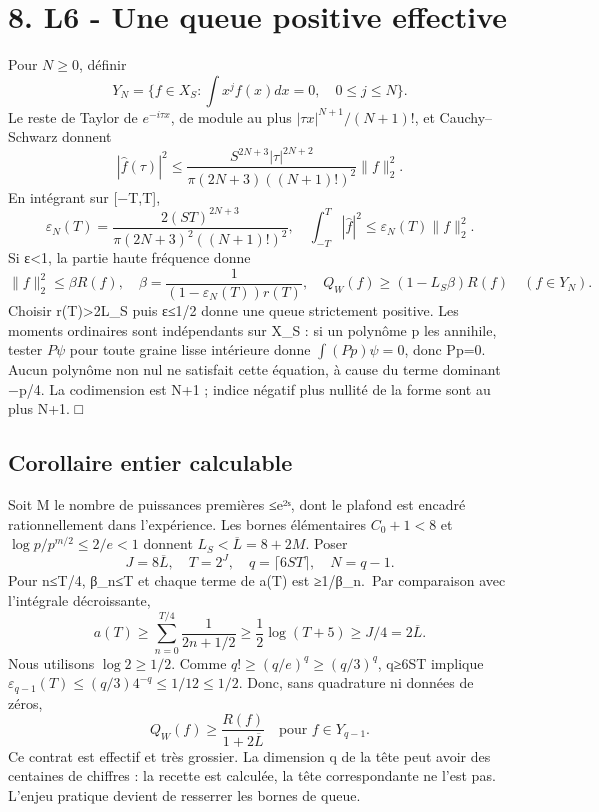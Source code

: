 \documentclass[
  10pt,
  a4paper,
]{article}
\begin{document}
\hypertarget{l6---une-queue-positive-effective}{%
\section{8. L6 - Une queue positive
effective}\label{l6---une-queue-positive-effective}}

Pour \(N\ge0\), définir \[
Y_N=\{f\in X_S:\int x^j f(x)dx=0,\quad0\le j\le N\}.
\] Le reste de Taylor de \(e^{-i\tau x}\), de module au plus
\(|\tau x|^{N+1}/(N+1)!\), et Cauchy--Schwarz donnent \[
|\widehat f(\tau)|^2\le
\frac{S^{2N+3}|\tau|^{2N+2}}{\pi(2N+3)((N+1)!)^2}\|f\|_2^2.
\] En intégrant sur {[}−T,T{]}, \[
\varepsilon_N(T)=\frac{2(ST)^{2N+3}}{\pi(2N+3)^2((N+1)!)^2},\quad
\int_{-T}^{T}|\widehat f|^2\le\varepsilon_N(T)\|f\|_2^2.
\] Si ε\textless1, la partie haute fréquence donne \[
\|f\|_2^2\le\beta R(f),\quad
\beta=\frac1{(1-\varepsilon_N(T))r(T)},\quad
Q_W(f)\ge(1-L_S\beta)R(f)\quad(f\in Y_N).
\] Choisir r(T)\textgreater2L\_S puis ε≤1/2 donne une queue strictement
positive. Les moments ordinaires sont indépendants sur X\_S : si un
polynôme p les annihile, tester \(P\psi\) pour toute graine lisse
intérieure donne \(\int(Pp)\psi=0\), donc Pp=0. Aucun polynôme non nul
ne satisfait cette équation, à cause du terme dominant −p/4. La
codimension est N+1 ; indice négatif plus nullité de la forme sont au
plus N+1. □

\hypertarget{corollaire-entier-calculable}{%
\subsection{Corollaire entier
calculable}\label{corollaire-entier-calculable}}

Soit M le nombre de puissances premières ≤e²ˢ, dont le plafond est
encadré rationnellement dans l'expérience. Les bornes élémentaires
\(C_0+1<8\) et \(\log p/p^{m/2}\le2/e<1\) donnent
\(L_S<\overline L=8+2M\). Poser \[
J=8\overline L,\quad T=2^J,\quad q=\lceil6ST\rceil,\quad N=q-1.
\] Pour n≤T/4, β\_n≤T et chaque terme de a(T) est ≥1/β\_n.~Par
comparaison avec l'intégrale décroissante, \[
a(T)\ge\sum_{n=0}^{T/4}\frac1{2n+1/2}
\ge\frac12\log(T+5)\ge J/4=2\overline L.
\] Nous utilisons \(\log2\ge1/2\). Comme \(q!\ge(q/e)^q\ge(q/3)^q\),
q≥6ST implique \(\varepsilon_{q-1}(T)\le(q/3)4^{-q}\le1/12\le1/2\).
Donc, sans quadrature ni données de zéros, \[
\boxed{Q_W(f)\ge\frac{R(f)}{1+2\overline L}\quad\text{pour }f\in Y_{q-1}.}
\] Ce contrat est effectif et très grossier. La dimension q de la tête
peut avoir des centaines de chiffres : la recette est calculée, la tête
correspondante ne l'est pas. L'enjeu pratique devient de resserrer les
bornes de queue.
\end{document}
